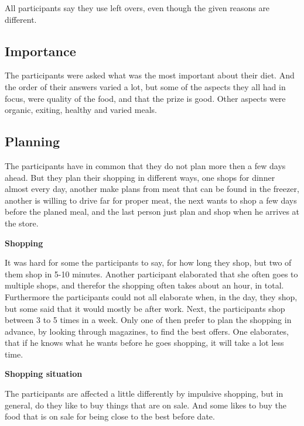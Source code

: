 All participants say they use left overs, even though the given reasons are different.
\subsection{Importance}
The participants were asked what was the most important about their diet. And the order of their answers varied a lot, but some of the aspects they all had in focus, were quality of the food, and that the prize is good. Other aspects were organic, exiting, healthy and varied meals.
\subsection{Planning}
The participants have in common that they do not plan more then a few days ahead. But they plan their shopping in different ways, one shops for dinner almost every day, another make plans from meat that can be found in the freezer, another is willing to drive far for proper meat, the next wants to shop a few days before the planed meal, and the last person just plan and shop when he arrives at the store.

\textbf{Shopping}

It was hard for some the participants to say, for how long they shop, but two of them shop in 5-10 minutes. Another participant elaborated that she often goes to multiple shops, and therefor the shopping often takes about an hour, in total. Furthermore the participants could not all elaborate when, in the day, they shop, but some said that it would mostly be after work. Next, the participants shop between 3 to 5 times in a week. Only one of then prefer to plan the shopping in advance, by looking through magazines, to find the best offers. One elaborates, that if he knows what he wants before he goes shopping, it will take a lot less time.

\textbf{Shopping situation}

The participants are affected a little differently by impulsive shopping, but in general, do they like to buy things that are on sale. And some likes to buy the food that is on sale for being close to the best before date.